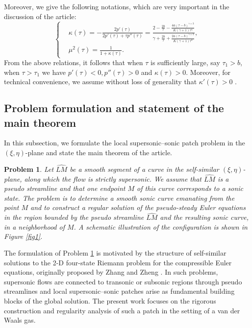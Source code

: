 \documentclass[3p,11pt]{elsarticle}
\numberwithin{equation}{section}
\newtheorem{problem}{Problem}[section]
\begin{document}
Moreover, we give the following notations, which are very important in the discussion of the article:
\begin{equation*}\label{Pre1_9}
    \begin{cases}
       & \kappa(\tau)=-\frac{2p'(\tau)}{2p'(\tau)+\tau p''(\tau)}=\frac{2-\frac{2b}{\tau}-\frac{4a(\tau-b)^{\gamma+3}}{K(\gamma+1)\tau^4}}{\gamma+\frac{2b}{\tau}+\frac{2a(\tau-b)^{\gamma+3}}{K(\gamma+1)\tau^4}},\\
    &\mu^2(\tau)=\frac{1}{1+\kappa(\tau)}. 
    \end{cases}
\end{equation*}
From the above relations, it follows that when $\tau$ is sufficiently large, say $\tau_1>b$, when $\tau>\tau_1$ we have $p'(\tau)<0, p''(\tau)>0$ and $\kappa(\tau)>0$. %
Moreover, for technical convenience, we assume without loss of generality that $\kappa'(\tau)>0$ \cite{Rahul4, Mzafar2023}.

\subsection{Problem formulation and statement of the main theorem}

In this subsection, we formulate the local supersonic–sonic patch problem in the $(\xi, \eta)$-plane and state the main theorem of the article.
\begin{problem}\label{P1}
Let $\widehat{LM}$ be a smooth segment of a curve in the self-similar $(\xi,\eta)$-plane, along which the flow is strictly supersonic. We assume that $\widehat{LM}$ is a pseudo streamline and that one endpoint $M$ of this curve corresponds to a sonic state. The problem is to determine a smooth sonic curve emanating from the point $M$ and to construct a regular solution of the pseudo-steady Euler equations in the region bounded by the pseudo streamline $\widehat{LM}$ and the resulting sonic curve, in a neighborhood of $M$. A schematic illustration of the configuration is shown in Figure \ref{fig1}.
\end{problem}
The formulation of Problem \ref{P1} is motivated by the structure of self-similar solutions to the 2-D four-state Riemann problem for the compressible Euler equations, originally proposed by Zhang and Zheng \cite{conjecture1990}. In such problems, supersonic flows are connected to transonic or subsonic regions through pseudo streamlines and local supersonic–sonic patches arise as fundamental building blocks of the global solution. The present work focuses on the rigorous construction and regularity analysis of such a patch in the setting of a van der Waals gas.
\end{document}
